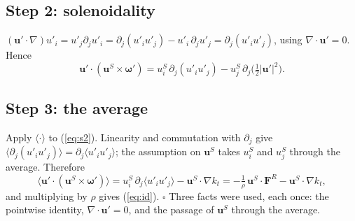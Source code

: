 \documentclass[10pt]{article}
\newcommand{\av}[1]{\langle #1\rangle}\newcommand{\uS}{\bm u^S}\newcommand{\WS}{\mathcal W_S}\newcommand{\PS}{\mathcal P_S}
\newcommand{\bu}{\bm u}\newcommand{\bU}{\bm U}\newcommand{\bxi}{\bm\xi}\newcommand{\dd}{\mathrm d}
\begin{document}
\subsection{Step 2: solenoidality}
$(\bu'\cdot\nabla)u'_i=u'_j\partial_ju'_i=\partial_j(u'_iu'_j)-u'_i\,\partial_ju'_j=\partial_j(u'_iu'_j)$, using $\nabla\cdot\bu'=0$. Hence
\begin{equation}
\bu'\cdot(\uS\times\bm\omega')=u^S_i\,\partial_j(u'_iu'_j)-u^S_j\,\partial_j\big(\tfrac12|\bu'|^2\big).
\label{eq:s2}
\end{equation}

\subsection{Step 3: the average}
Apply $\av\cdot$ to (\ref{eq:s2}). Linearity and commutation with $\partial_j$ give $\av{\partial_j(u'_iu'_j)}=\partial_j\av{u'_iu'_j}$; the assumption on $\uS$ takes $u^S_i$ and $u^S_j$ through the average. Therefore
\[
\av{\bu'\cdot(\uS\times\bm\omega')}=u^S_i\,\partial_j\av{u'_iu'_j}-\uS\!\cdot\nabla k_t
=-\tfrac1\rho\,\uS\!\cdot\bm F^R-\uS\!\cdot\nabla k_t ,
\]
and multiplying by $\rho$ gives (\ref{eq:id}). $\square$ Three facts were used, each once: the pointwise identity, $\nabla\cdot\bu'=0$, and the passage of $\uS$ through the average.
\end{document}
